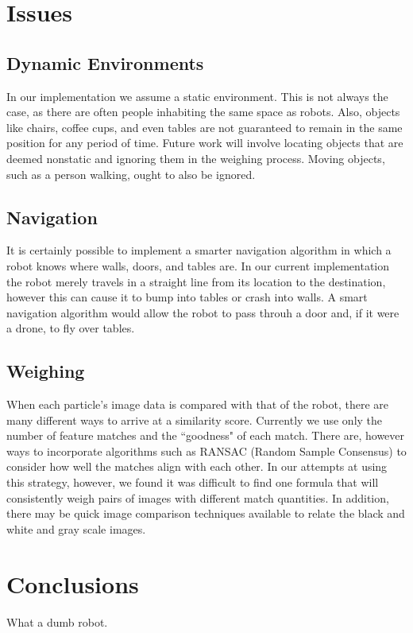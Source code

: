 \documentclass[a4paper,11pt]{article}
\begin{document}
\section{Issues}
\subsection{Dynamic Environments}
In our implementation we assume a static environment. This is not always the case, as there are often people inhabiting the same space as robots. Also, objects like chairs, coffee cups, and even tables are not guaranteed to remain in the same position for any period of time. Future work will involve locating objects that are deemed nonstatic and ignoring them in the weighing process. Moving objects, such as a person walking, ought to also be ignored.

\subsection{Navigation}
It is certainly possible to implement a smarter navigation algorithm in which a robot knows where walls, doors, and tables are. In our current implementation the robot merely travels in a straight line from its location to the destination, however this can cause it to bump into tables or crash into walls. A smart navigation algorithm would allow the robot to pass throuh a door and, if it were a drone, to fly over tables.

\subsection{Weighing}
When each particle's image data is compared with that of the robot, there are many different ways to arrive at a similarity score. Currently we use only the number of feature matches and the ``goodness" of each match. There are, however ways to incorporate algorithms such as RANSAC (Random Sample Consensus) to consider how well the matches align with each other. In our attempts at using this strategy, however, we found it was difficult to find one formula that will consistently weigh pairs of images with different match quantities. In addition, there may be quick image comparison techniques available to relate the black and white and gray scale images.

\section{Conclusions}
What a dumb robot.








  
\end{document}
